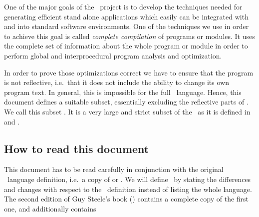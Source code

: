 One of the major goals of the \APPLY\ project is to develop the techniques
needed for generating efficient stand alone applications which easily can 
be integrated with and into standard software environments. One of the 
techniques we use in order to achieve this goal is called {\em complete 
compilation} of programs or modules. It uses the complete set of 
information about the whole program or module in order to perform global 
and interprocedural program analysis and optimization. 

In order to prove those optimizations correct we have to ensure that
the program is not reflective, i.e.\ that it does not include the
ability to change its own program text. In general, this is impossible
for the full \CL\ language. Hence, this document defines a suitable
subset, essentially excluding the reflective parts of \CL. We call
this subset . It is a very large and strict subset of the \CL\ as
it is defined in \cite{Steele84} and \cite{Steele90}.




\subsection{How to read this document}

This document has to be read carefully in conjunction with the
original \CL\ language definition, i.e.\ a copy of \cite{Steele84} or
\cite{Steele90}. We will define \ by stating the differences and 
changes with respect to the \CL\ definition instead of listing the whole 
language. The second edition of Guy Steele's book
(\cite{Steele90}) contains a complete copy of the first one, and
additionally contains

